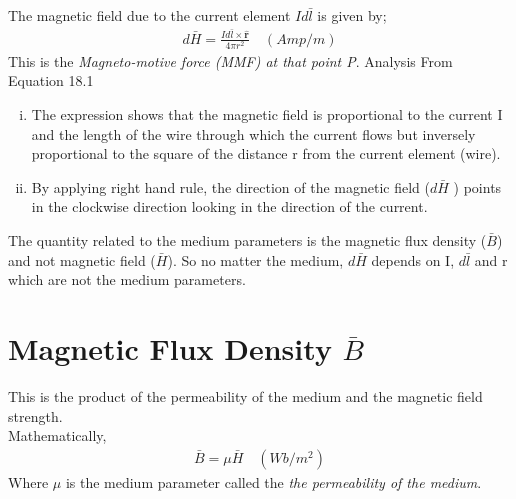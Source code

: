 The magnetic field due to the current element $Id\bar{l}$ is given by; \\
\begin{align}
\boxed{d\bar{H}= \frac{Id\bar{l} \times \hat{\textbf{r}}}{4\pi r^{2}}}\quad (Amp/m)
\end{align} 
This is the \emph{Magneto-motive force (MMF) at that point P}. Analysis From Equation 18.1
\begin{enumerate}[(i)]
\item The expression shows that the magnetic field is proportional to the current I and the length of the wire through which the current flows but inversely proportional to the square of the distance r from the current element (wire).
\item By applying right hand rule, the direction of the magnetic field ($d\bar{H}$ ) points in the clockwise direction looking in the direction of the current.
\end{enumerate}

The quantity related to the medium parameters is the magnetic flux density ($\bar{B}$) and not magnetic field ($\bar{H}$). So no matter the medium, $ d\bar{H} $ depends on I, $ d\bar{l} $ and r which are not the medium parameters. 

\section{Magnetic Flux Density $\bar{B}$}
This is the product of the permeability of the medium and the magnetic field strength.\\
Mathematically, 
\begin{align}
\boxed{\bar{B} = \mu\bar{H}}\quad (Wb/m^{2})
\end{align}
Where $ \mu $ is the medium parameter called the \emph{the permeability of the medium}.

